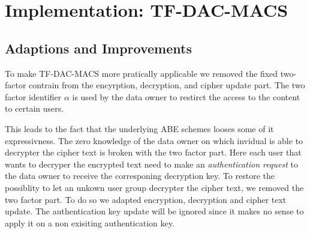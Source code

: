 \section{Implementation: TF-DAC-MACS}


\subsection{Adaptions and Improvements}
To make TF-DAC-MACS more pratically applicable we removed the fixed two-factor contrain from the encyrption, decryption, and cipher update part. The two factor identifier $\alpha$ is used by the data owner to restirct the access to the content to certain users. 

This leads to the fact that the underlying ABE schemes looses some of it expressivness. The zero knowledge of the data owner on which invidual is able to decrypter the cipher text is broken with the two factor part. Here each user that wants to decryper the encrypted text need to make an \textit{authentication request} to the data owner to receive the corresponing decryption key. To restore the possiblity to let an unkown user group decrypter the cipher text, we removed the two factor part. To do so we adapted encryption, decryption and cipher text update. The authentication key update will be ignored since it makes no sense to apply it on a non exisiting authentication key. 


